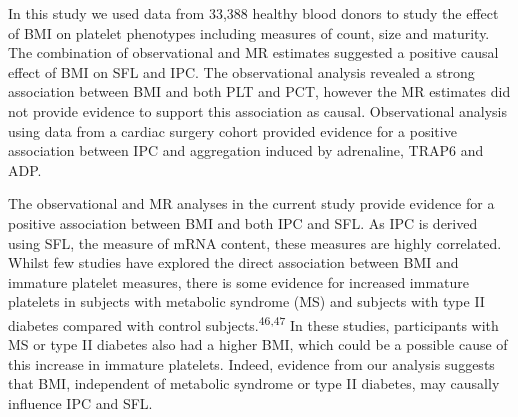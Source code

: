 \documentclass[11pt,twoside]{bristolthesis}
\begin{document}
In this study we used data from 33,388 healthy blood donors to study the effect of BMI on platelet phenotypes including measures of count, size and maturity. The combination of observational and MR estimates suggested a positive causal effect of BMI on SFL and IPC. The observational analysis revealed a strong association between BMI and both PLT and PCT, however the MR estimates did not provide evidence to support this association as causal. Observational analysis using data from a cardiac surgery cohort provided evidence for a positive association between IPC and aggregation induced by adrenaline, TRAP6 and ADP.

The observational and MR analyses in the current study provide evidence for a positive association between BMI and both IPC and SFL. As IPC is derived using SFL, the measure of mRNA content, these measures are highly correlated. Whilst few studies have explored the direct association between BMI and immature platelet measures, there is some evidence for increased immature platelets in subjects with metabolic syndrome (MS) and subjects with type II diabetes compared with control subjects.\textsuperscript{46,47} In these studies, participants with MS or type II diabetes also had a higher BMI, which could be a possible cause of this increase in immature platelets. Indeed, evidence from our analysis suggests that BMI, independent of metabolic syndrome or type II diabetes, may causally influence IPC and SFL.
\end{document}
